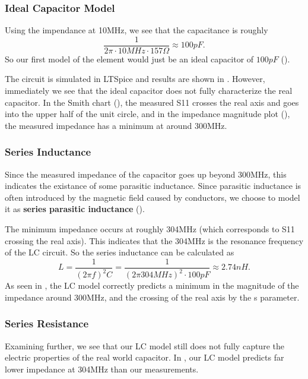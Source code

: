 \documentclass{article}
\begin{document}
\subsubsection{Ideal Capacitor Model}

Using the impendance at 10MHz, we see that the capacitance is roughly
$$\frac{1}{2\pi\cdot 10MHz \cdot 157 \Omega} \approx 100pF .$$
So our first model of the element would just be an ideal capacitor of $100pF$ ().

The circuit is simulated in LTSpice and results are shown in .
However, immediately we see that the ideal capacitor does not fully characterize the real capacitor.
In the Smith chart (), the measured S11 crosses the real axis and goes into the upper half of the unit circle, and in the impedance magnitude plot (), the measured impedance has a minimum at around 300MHz.

\subsubsection{Series Inductance}

Since the measured impedance of the capacitor goes up beyond 300MHz, this indicates the existance of some parasitic inductance.
Since parasitic inductance is often introduced by the magnetic field caused by conductors, we choose to model it as \textbf{series parasitic inductance} ().

The minimum impedance occurs at roughly 304MHz (which corresponds to S11 crossing the real axis).
This indicates that the 304MHz is the resonance frequency of the LC circuit.
So the series inductance can be calculated as
\[
    L = \frac{1}{(2\pi f)^2 C}
    = \frac{1}{(2\pi 304MHz)^2 \cdot 100pF}
    \approx
    2.74nH.
\]
As seen in , the LC model correctly predicts a minimum in the magnitude of the impedance around 300MHz, and the crossing of the real axis by the s parameter.

\subsubsection{Series Resistance}
Examining  further, we see that our LC model still does not fully capture the electric properties of the real world capacitor.
In , our LC model predicts far lower impedance at 304MHz than our measurements.
\end{document}
